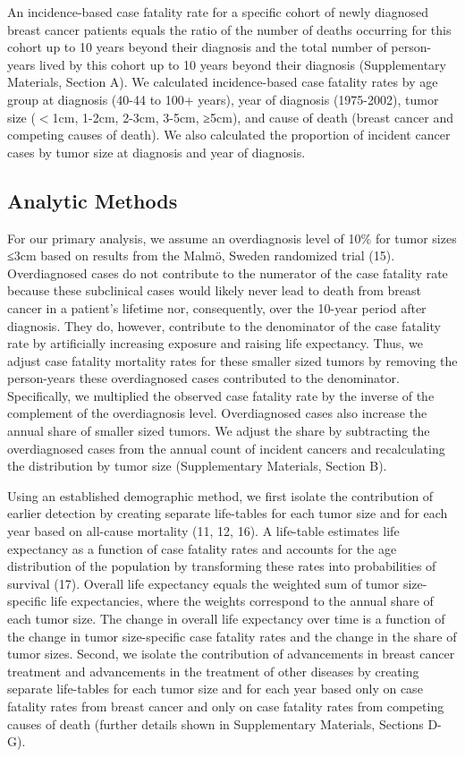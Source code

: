 \documentclass[11pt,letterpaper]{article}
\theoremstyle{plain}
\theoremstyle{remark}
\numberwithin{equation}{section}
\begin{document}
An incidence-based case fatality rate for a specific cohort of newly
diagnosed breast cancer patients equals the ratio of the number of
deaths occurring for this cohort up to 10 years beyond their diagnosis
and the total number of person-years lived by this cohort up to 10
years beyond their diagnosis (Supplementary Materials, Section A).  We
calculated incidence-based case fatality rates by age group at
diagnosis (40-44 to 100+ years), year of diagnosis (1975-2002), tumor
size ($<$1cm, 1-2cm, 2-3cm, 3-5cm, ≥5cm), and cause of death (breast
cancer and competing causes of death).  We also calculated the
proportion of incident cancer cases by tumor size at diagnosis and
year of diagnosis.

\subsection{Analytic Methods}
For our primary analysis, we assume an overdiagnosis level of 10\% for
tumor sizes ≤3cm based on results from the Malmö, Sweden randomized
trial (15).  Overdiagnosed cases do not contribute to the numerator of
the case fatality rate because these subclinical cases would likely
never lead to death from breast cancer in a patient’s lifetime nor,
consequently, over the 10-year period after diagnosis.  They do,
however, contribute to the denominator of the case fatality rate by
artificially increasing exposure and raising life expectancy.  Thus,
we adjust case fatality mortality rates for these smaller sized tumors
by removing the person-years these overdiagnosed cases contributed to
the denominator.  Specifically, we multiplied the observed case
fatality rate by the inverse of the complement of the overdiagnosis
level.  Overdiagnosed cases also increase the annual share of smaller
sized tumors.  We adjust the share by subtracting the overdiagnosed
cases from the annual count of incident cancers and recalculating the
distribution by tumor size (Supplementary Materials, Section B).

Using an established demographic method, we first isolate the
contribution of earlier detection by creating separate life-tables for
each tumor size and for each year based on all-cause mortality (11,
12, 16).  A life-table estimates life expectancy as a function of case
fatality rates and accounts for the age distribution of the population
by transforming these rates into probabilities of survival (17).
Overall life expectancy equals the weighted sum of tumor size-specific
life expectancies, where the weights correspond to the annual share of
each tumor size.  The change in overall life expectancy over time is a
function of the change in tumor size-specific case fatality rates and
the change in the share of tumor sizes.  Second, we isolate the
contribution of advancements in breast cancer treatment and
advancements in the treatment of other diseases by creating separate
life-tables for each tumor size and for each year based only on case
fatality rates from breast cancer and only on case fatality rates from
competing causes of death (further details shown in Supplementary
Materials, Sections D-G).
\end{document}
